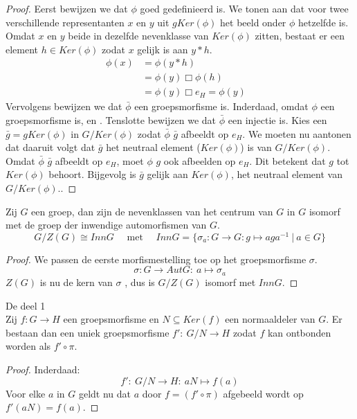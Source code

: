 \documentclass[main.tex]{subfiles}
\begin{document}
\begin{st}
  \begin{proof}
    Eerst bewijzen we dat $\phi$ goed gedefinieerd is. We tonen aan dat voor twee verschillende representanten $x$ en $y$ uit $gKer(\phi)$ het beeld onder $\phi$ hetzelfde is.
    Omdat $x$ en $y$ beide in dezelfde nevenklasse van $Ker(\phi)$ zitten, bestaat er een element $h\in Ker(\phi)$ zodat $x$ gelijk is aan $y*h$.
    \[
    \begin{array}{rll}
      \phi(x) &= \phi(y*h) &\\
      &= \phi(y) \Box \phi(h) &\\
      &= \phi(y) \Box e_{H} = \phi(y)
    \end{array}
    \]
    Vervolgens bewijzen we dat $\bar{\phi}$ een groepsmorfisme is.
    Inderdaad, omdat $\phi$ een groepsmorfisme is, en \waarom.
    Tenslotte bewijzen we dat $\bar{\phi}$ een injectie is.
    Kies een $\bar{g} = gKer(\phi)$ in $G/Ker(\phi)$ zodat $\bar{\phi}$ $\bar{g}$ afbeeldt op $e_{H}$.
    We moeten nu aantonen dat daaruit volgt dat $\bar{g}$ het neutraal element ($Ker(\phi)$) is van $G/Ker(\phi)$.
    Omdat $\bar{\phi}$ $\bar{g}$ afbeeldt op $e_{H}$, moet $\phi$ $g$ ook afbeelden op $e_{H}$.
    \waarom
    Dit betekent dat $g$ tot $Ker(\phi)$ behoort. Bijgevolg is $\bar{g}$ gelijk aan $Ker(\phi)$, het neutraal element van $G/Ker(\phi)$..
  \end{proof}
\end{st}

\begin{pr}
  Zij $G$ een groep, dan zijn de nevenklassen van het centrum van $G$ in $G$ isomorf met de groep der inwendige automorfismen van $G$.
  \[ G/Z(G) \cong Inn G \quad\text{ met }\quad Inn G = \{ \sigma_{a}: G \rightarrow G: g \mapsto aga^{-1} \ |\ a\in G \} \]

  \begin{proof}
    We passen de eerste morfismestelling toe op het groepsmorfisme $\sigma$.
    \[ \sigma: G \rightarrow Aut G:\ a \mapsto \sigma_{a} \]
    $Z(G)$ is nu de kern van $\sigma$ \waarom , dus is $G/Z(G)$ isomorf met $Inn G$.
  \end{proof}
\end{pr}

\begin{st}
  De  deel 1\\
  Zij $f: G\rightarrow H$ een groepsmorfisme en $N\subseteq Ker(f)$ een normaaldeler van $G$.
  Er bestaan dan een uniek groepsmorfisme $f':\ G/N \rightarrow H$ zodat $f$ kan ontbonden worden als $f'\circ \pi$.

  \begin{proof}
    Inderdaad:
    \[ f':\ G/N \rightarrow H:\ aN \mapsto f(a) \]
    Voor elke $a$ in $G$ geldt nu dat $a$ door $f= (f' \circ \pi)$ afgebeeld wordt op $f'(aN) = f(a)$.
  \end{proof}
\end{st}
\end{document}
